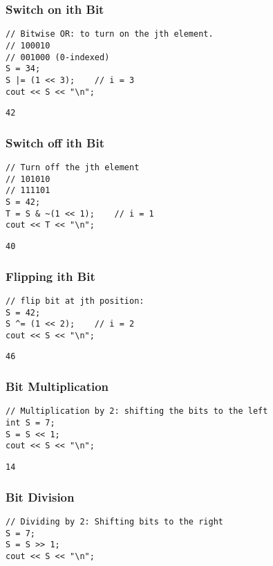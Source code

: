 \documentclass[11pt]{article}
\begin{document}
\subsubsection{Switch on ith Bit}
\begin{lstlisting}
// Bitwise OR: to turn on the jth element.
// 100010
// 001000 (0-indexed)
S = 34;
S |= (1 << 3);    // i = 3
cout << S << "\n";
\end{lstlisting}

\begin{lstlisting}
42
\end{lstlisting}

\subsubsection{Switch off ith Bit}
\begin{lstlisting}
// Turn off the jth element
// 101010
// 111101
S = 42;
T = S & ~(1 << 1);    // i = 1
cout << T << "\n";
\end{lstlisting}

\begin{lstlisting}
40
\end{lstlisting}

\subsubsection{Flipping ith Bit}
\begin{lstlisting}
// flip bit at jth position: 
S = 42;
S ^= (1 << 2);    // i = 2
cout << S << "\n";
\end{lstlisting}

\begin{lstlisting}
46
\end{lstlisting}

\subsubsection{Bit Multiplication}
\begin{lstlisting}
// Multiplication by 2: shifting the bits to the left
int S = 7;
S = S << 1;
cout << S << "\n";
\end{lstlisting}

\begin{lstlisting}
14
\end{lstlisting}

\subsubsection{Bit Division}
\begin{lstlisting}
// Dividing by 2: Shifting bits to the right
S = 7;
S = S >> 1;
cout << S << "\n";
\end{lstlisting}
\end{document}
